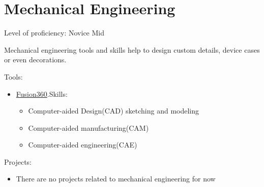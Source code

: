 \section{Mechanical Engineering}

Level of proficiency: Novice Mid

\vintent

Mechanical engineering tools and skills help to design custom details,
device cases or even decorations.

\vintent

Tools:
\begin{itemize}
    \item \href{https://www.autodesk.com/products/fusion-360/overview}{Fusion360}.\break Skills:
    \begin{itemize}
        \item Computer-aided Design(CAD) sketching and modeling
        \item Computer-aided manufacturing(CAM)
        \item Computer-aided engineering(CAE)
    \end{itemize}
\end{itemize}

\vintent

Projects:
\begin{itemize}
    \item There are no projects related to mechanical engineering for now
\end{itemize}
